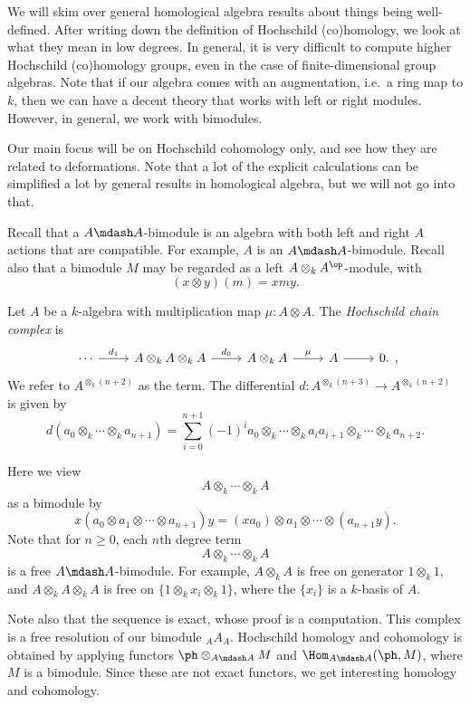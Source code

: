 \documentclass[a4paper]{article}
\begin{document}
We will skim over general homological algebra results about things being well-defined. After writing down the definition of Hochschild (co)homology, we look at what they mean in low degrees. In general, it is very difficult to compute higher Hochschild (co)homology groups, even in the case of finite-dimensional group algebras. Note that if our algebra comes with an augmentation, i.e.\ a ring map to $k$, then we can have a decent theory that works with left or right modules. However, in general, we work with bimodules.

Our main focus will be on Hochschild cohomology only, and see how they are related to deformations. Note that a lot of the explicit calculations can be simplified a lot by general results in homological algebra, but we will not go into that.

Recall that a $A\mdash A$-bimodule is an algebra with both left and right $A$ actions that are compatible. For example, $A$ is an $A\mdash A$-bimodule. Recall also that a bimodule $M$ may be regarded as a left $A \otimes_k A^{\op}$-module, with
\[
  (x \otimes y)(m) = x my.
\]
\begin{defi}
  Let $A$ be a $k$-algebra with multiplication map $\mu: A \otimes A$. The \emph{Hochschild chain complex} is
  \[
    \begin{tikzcd}
      \cdots \ar[r, "d_1"] & A \otimes_k A \otimes_k A \ar[r, "d_0"] & A \otimes_k A \ar[r, "\mu"] & A \ar[r] & 0.
    \end{tikzcd},
  \]
  We refer to $A^{\otimes_k(n + 2)}$ as the  term. The differential $d: A^{\otimes_k (n + 3)} \to A^{\otimes_k(n + 2)}$ is given by
  \[
    d(a_0 \otimes_k \cdots \otimes_k a_{n + 1}) = \sum_{i = 0}^{n + 1} (-1)^i a_0 \otimes_k \cdots \otimes_k a_i a_{i + 1} \otimes_k \cdots \otimes_k a_{n + 2}.
  \]
\end{defi}
Here we view
\[
  A \otimes_k \cdots \otimes_k A
\]
as a bimodule by
\[
  x(a_0 \otimes a_1 \otimes \cdots \otimes a_{n + 1})y = (x a_0) \otimes a_1 \otimes \cdots \otimes (a_{n + 1} y).
\]
Note that for $n \geq 0$, each $n$th degree term
\[
  A \otimes_k \cdots \otimes_k A
\]
is a free $A\mdash A$-bimodule. For example, $A \otimes_k A$ is free on generator $1 \otimes_k 1$, and $A \otimes_k A \otimes_k A$ is free on $\{1 \otimes_k x_i \otimes_k 1\}$, where the $\{x_i\}$ is a $k$-basis of $A$.

Note also that the sequence is exact, whose proof is a computation. This complex is a free resolution of our bimodule $_AA_A$. Hochschild homology and cohomology is obtained by applying functors $\ph\otimes_{A\mdash A} M$ and $\Hom_{A\mdash A}(\ph, M)$, where $M$ is a bimodule. Since these are not exact functors, we get interesting homology and cohomology.
\end{document}
